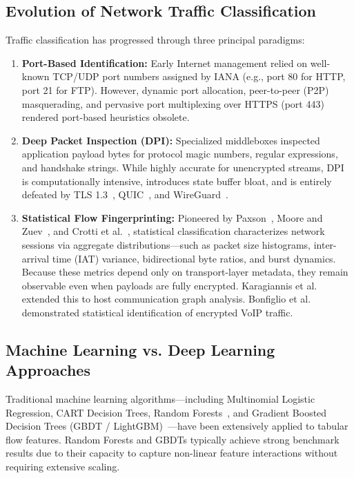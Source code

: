 \documentclass[conference]{IEEEtran}
\begin{document}
\subsection{Evolution of Network Traffic Classification}
Traffic classification has progressed through three principal paradigms:
\begin{enumerate}
    \item \textbf{Port-Based Identification:} Early Internet management relied on well-known TCP/UDP port numbers assigned by IANA (e.g., port 80 for HTTP, port 21 for FTP). However, dynamic port allocation, peer-to-peer (P2P) masquerading, and pervasive port multiplexing over HTTPS (port 443) rendered port-based heuristics obsolete.
    \item \textbf{Deep Packet Inspection (DPI):} Specialized middleboxes inspected application payload bytes for protocol magic numbers, regular expressions, and handshake strings. While highly accurate for unencrypted streams, DPI is computationally intensive, introduces state buffer bloat, and is entirely defeated by TLS 1.3~\cite{rescorla2018tls}, QUIC~\cite{iyengar2021quic}, and WireGuard~\cite{donenfeld2017wireguard}.
    \item \textbf{Statistical Flow Fingerprinting:} Pioneered by Paxson~\cite{paxson1994empirically}, Moore and Zuev~\cite{moore2005internet}, and Crotti et al.~\cite{crotti2007traffic}, statistical classification characterizes network sessions via aggregate distributions---such as packet size histograms, inter-arrival time (IAT) variance, bidirectional byte ratios, and burst dynamics. Because these metrics depend only on transport-layer metadata, they remain observable even when payloads are fully encrypted. Karagiannis et al.~\cite{karagiannis2005blinc} extended this to host communication graph analysis. Bonfiglio et al.~\cite{bonfiglio2007revealing} demonstrated statistical identification of encrypted VoIP traffic.
\end{enumerate}

\subsection{Machine Learning vs. Deep Learning Approaches}
Traditional machine learning algorithms---including Multinomial Logistic Regression, CART Decision Trees, Random Forests~\cite{breiman2001random}, and Gradient Boosted Decision Trees (GBDT / LightGBM)~\cite{ke2017lightgbm}---have been extensively applied to tabular flow features. Random Forests and GBDTs typically achieve strong benchmark results due to their capacity to capture non-linear feature interactions without requiring extensive scaling.
\end{document}
